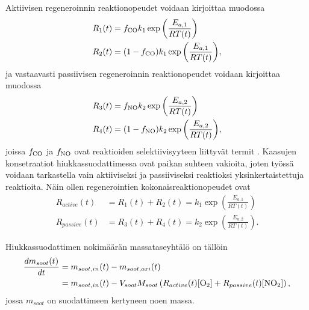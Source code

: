 Aktiivisen regeneroinnin reaktionopeudet voidaan kirjoittaa muodossa
\begin{align}
    R_1(t) &= f_{\ce{CO}} k_1 \exp{\left( \frac{E_{a, 1}}{RT(t)} \right)} \\%
    R_2(t) &= (1-f_{\ce{CO}}) k_1 \exp{\left( \frac{E_{a, 1}}{RT(t)} \right)} ,%
\end{align}
ja vastaavasti passiivisen regeneroinnin reaktionopeudet voidaan kirjoittaa muodossa
\begin{align}
    R_3(t) &= f_{\ce{NO}} k_2 \exp{\left( \frac{E_{a, 2}}{RT(t)} \right)} \\%
    R_4(t) &= (1-f_{\ce{NO}}) k_2 \exp{\left( \frac{E_{a, 2}}{RT(t)} \right)}, %
\end{align}
joissa \( f_{\ce{CO}}\) ja \( f_{\ce{NO}}\) ovat reaktioiden selektiivisyyteen liittyvät termit \cite{ZhongChao2022Eaos} \cite{DengYuanwang2017Iogc}.
Kaasujen konsetraatiot hiukkassuodattimessa ovat paikan suhteen vakioita, joten työssä voidaan tarkastella vain aktiiviseksi ja passiiviseksi reaktioksi yksinkertaistettuja reaktioita.
Näin ollen regenerointien kokonaisreaktionopeudet ovat
\begin{align}
    R_{active}(t) &= R_1(t) + R_2(t) =   k_1 \exp{\left( \frac{E_{a, 1}}{RT(t)} \right)} \\%
    R_{passive}(t) &= R_3(t)+ R_4(t) =  k_2 \exp{\left( \frac{E_{a, 2}}{RT(t)} \right)} . %
\end{align}


Hiukkassuodattimen nokimäärän massataseyhtälö on tällöin
\begin{align}
    \frac{dm_{soot}(t)}{dt} &= m_{soot, in}(t) - m_{soot, oxi}(t)\\
    &= m_{soot, in}(t) - V_{soot} M_{soot}\left( R_{active}(t)[\ce{O2}] + R_{passive}(t)[\ce{NO2}] \right),
\end{align}
jossa \(m_{soot}\) on suodattimeen kertyneen noen massa.


